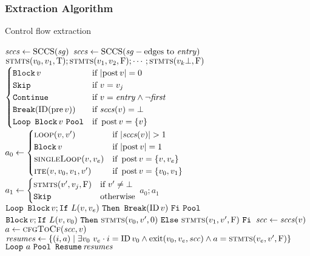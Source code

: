 \subsubsection{Extraction Algorithm}
\begin{algorithm}
  \caption{Control flow extraction}\label{algo:cf}
  \begin{algorithmic}[1]
      \State $\mathit{sccs}\gets\operatorname{SCCS}(\mathit{sg})$
        \State $\mathit{sccs}\gets\operatorname{SCCS}(\mathit{sg}-\text{edges to }\mathit{entry})$
      \EndIf
      \State {}
      \State\Return $\Call{stmts}{v_0,v_1,\true};\Call{stmts}{v_1,v_2,\false};\dotsb;\Call{stmts}{v_k\bot,\false}$%
    \EndFunction
      \State\Return $\begin{cases}
        \operatorname{\mathtt{Block}} v & \text{if }\lvert\operatorname{post} v\rvert=0 \\
        \mathtt{Skip} & \text{if }v=v_j \\
        \mathtt{Continue} & \text{if }v=\mathit{entry}\wedge\neg\mathit{first} \\
        \operatorname{\mathtt{Break}}(\operatorname{ID}(\operatorname{pre} v)) & \text{if }\mathit{sccs}(v)=\bot \\
        \mathtt{Loop}~\operatorname{\mathtt{Block}} v~\mathtt{Pool} & \text{if }\operatorname{post} v=\{v\}
      \end{cases}$ 
      \State {}
      \State $a_0\gets\begin{cases}
        \Call{loop}{v,v'} & \text{if }\abs{\var{sccs}(v)}>1 \\
        \ABB v & \text{if }\abs{\post v}=1 \\
        \Call{singleLoop}{v,v_e} & \text{if }\post v=\{v,v_e\} \\
        \Call{ite}{v,v_0,v_1,v'} & \text{if }\post v=\{v_0,v_1\}
      \end{cases}$
      \State $a_1\gets\begin{cases}
        \Call{stmts}{v',v_j,\false} & \text{if }v'\neq\bot \\
        \ASkip & \text{otherwise}
      \end{cases}$
      \State\Return $a_0;a_1$
    \EndFunction
      \State\Return $\mathtt{Loop}~\operatorname{\mathtt{Block}} v;\mathtt{If}~L(v,v_e)~\mathtt{Then}~\operatorname{\mathtt{Break}}(\operatorname{ID} v)~\mathtt{Fi}~\mathtt{Pool}$
    \EndFunction
        \State\Return $\ABB v;\AIf~L(v,v_0)~\AThen~\Call{stmts}{v_0,v',0}~\AElse~ \Call{stmts}{v_1,v',\false}~\AFi$
    \EndFunction
      \State $\mathit{scc}\gets\mathit{sccs}(v)$
      \State $a\gets\Call{cfgToCf}{\var{scc},v}$
      \State $\var{resumes}\gets\{(i,a)\mid\exists v_0~v_e\cdot i=\ID v_0\wedge \exit(v_0,v_e,\var{scc})\wedge a=\Call{stmts}{v_e,v',\false}\}$
      \State\Return $\mathtt{Loop}~a~\mathtt{Pool}~\operatorname{\mathtt{Resume}}\mathit{resumes}$
    \EndFunction
  \end{algorithmic}
\end{algorithm}

